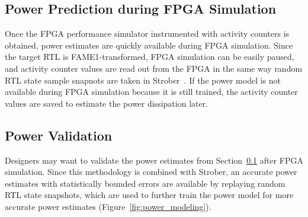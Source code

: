 \subsection{Power Prediction during FPGA Simulation}
\label{sec:power_prediction}
Once the FPGA performance simulator instrumented with activity counters is obtained,
power estimates are quickly available during FPGA simulation. Since the target RTL
is FAME1-transformed, FPGA simulation can be easily paused, and activity counter
values are read out from the FPGA in the same way random RTL state sample snapnots
are taken in Strober~\cite{Kim2016}. If the power model is not available during
FPGA simulation because it is still trained, the activity counter values are saved
to estimate the power dissipation later.

\subsection{Power Validation}
\label{sec:power_validation}
Designers may want to validate the power estimates from Section~\ref{sec:power_prediction}
after FPGA simulation. Since this methodology is combined with Strober,
an accurate power estimates with statistically bounded errors are available by
replaying random RTL state snapshots, which are used to further train the power model
for more accurate power estimates (Figure~\ref{fig:power_modeling}).
